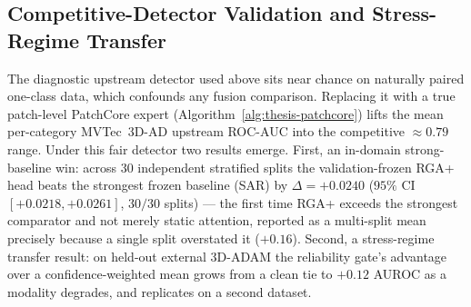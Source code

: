 \documentclass[11pt]{article}
\begin{document}

\subsection{Competitive-Detector Validation and Stress-Regime Transfer}

The diagnostic upstream detector used above sits near chance on naturally
paired one-class data, which confounds any fusion comparison. Replacing it
with a true patch-level PatchCore expert (Algorithm~\ref{alg:thesis-patchcore})
lifts the mean per-category MVTec~3D-AD upstream ROC-AUC into the competitive
$\approx 0.79$ range. Under this fair detector two results emerge. First, an
in-domain strong-baseline win: across $30$ independent stratified splits the
validation-frozen RGA+ head beats the strongest frozen baseline (SAR) by
$\Delta = +0.0240$ ($95\%$ CI $[+0.0218,+0.0261]$, $30/30$ splits) --- the
first time RGA+ exceeds the strongest comparator and not merely static
attention, reported as a multi-split mean precisely because a single split
overstated it ($+0.16$). Second, a stress-regime transfer result: on held-out
external 3D-ADAM the reliability gate's advantage over a confidence-weighted
mean grows from a clean tie to $+0.12$ AUROC as a modality degrades, and
replicates on a second dataset.
\end{document}
